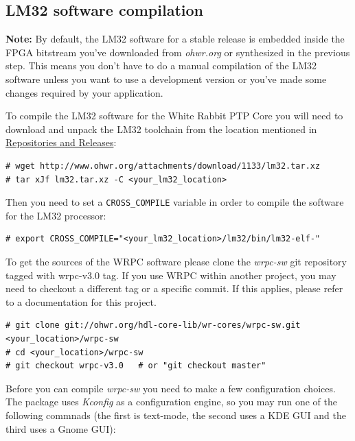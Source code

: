 \documentclass[a4paper, 12pt]{article}
\newcommand{\link}[1]{\hyperref[#1]{#1}}
\newcommand{\codeHook}[1]{\mbox{\ttfamily\MakeTextUppercase{#1}}}
\begin{document}
\label{LM32 software compilation}
\subsection{LM32 software compilation}

\textbf{Note:} By default, the \codeHook{lm32} software for a stable release is embedded
inside the FPGA bitstream you've downloaded from \textit{ohwr.org} or synthesized in
the previous step. This means you don't have to do a manual compilation of the
\codeHook{lm32} software unless you want to use a development version or you've made
some changes required by your application.

\vspace{1em}
To compile the \codeHook{lm32} software for the White Rabbit \codeHook{ptp} Core you will
need to download and unpack the \codeHook{lm32} toolchain from the location mentioned
in \link{Repositories and Releases}:

\begin{lstlisting}
# wget http://www.ohwr.org/attachments/download/1133/lm32.tar.xz
# tar xJf lm32.tar.xz -C <your_lm32_location>
\end{lstlisting}

Then you need to set a \texttt{CROSS\_COMPILE} variable in order
to compile the software for the \codeHook{lm32} processor:

\begin{lstlisting}
# export CROSS_COMPILE="<your_lm32_location>/lm32/bin/lm32-elf-"
\end{lstlisting}

To get the sources of the \codeHook{wrpc} software please clone the \textit{wrpc-sw} git
repository tagged with wrpc-v3.0 tag. If you use \codeHook{wrpc} within another
project, you may need to checkout a different tag or a specific commit. If this
applies, please refer to a documentation for this project.

\begin{lstlisting}
# git clone git://ohwr.org/hdl-core-lib/wr-cores/wrpc-sw.git <your_location>/wrpc-sw
# cd <your_location>/wrpc-sw
# git checkout wrpc-v3.0   # or "git checkout master"
\end{lstlisting}

Before you can compile \textit{wrpc-sw} you need to make a few configuration choices.
The package uses \textit{Kconfig} as a configuration engine, so you may run one of the
following commnads (the first is text-mode, the second uses a KDE GUI
and the third uses a Gnome GUI):
\end{document}
